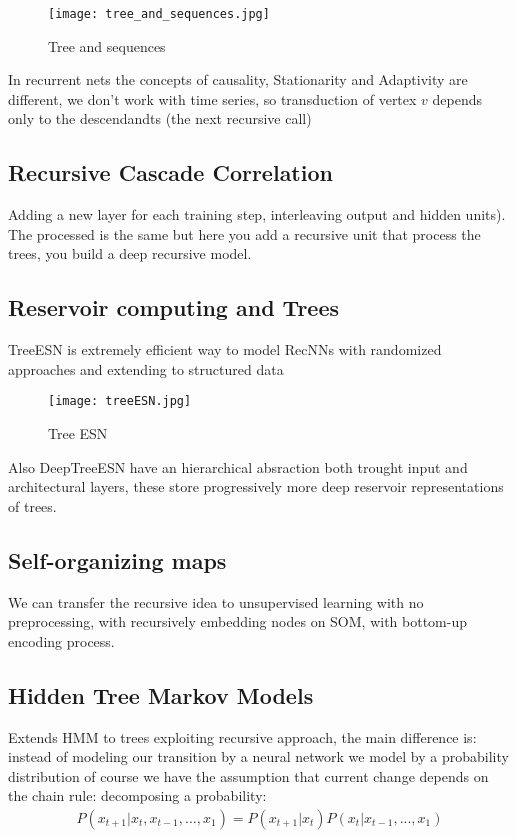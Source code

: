 \documentclass[12pt]{book}
\begin{document}
\begin{figure}[h!]
	\centering
	\texttt{[image: tree\_and\_sequences.jpg]}
	\caption{Tree and sequences}
	\label{fig:tree_rnn}
\end{figure}

In recurrent nets the concepts of causality, Stationarity and Adaptivity are different, we don't work with time series, so transduction of vertex $v$ depends only to the descendandts (the next recursive call)

\subsection{Recursive Cascade Correlation}
Adding a new layer for each training step, interleaving output and hidden units). The processed is the same but here you add a recursive unit that process the trees, you build a deep recursive model.

\subsection{Reservoir computing and Trees}
TreeESN is extremely efficient way to model RecNNs with randomized approaches and extending to structured data

\begin{figure}[h!]
	\centering
	\texttt{[image: treeESN.jpg]}
	\caption{Tree ESN}
	\label{fig:tree_esn}
\end{figure}

Also DeepTreeESN have an hierarchical absraction both trought input and architectural layers, these store progressively more deep reservoir representations of trees.

\subsection{Self-organizing maps}
We can transfer the recursive idea to unsupervised learning with no preprocessing, with recursively embedding nodes on SOM, with bottom-up encoding process.
\subsection{Hidden Tree Markov Models}
Extends HMM to trees exploiting recursive approach, the main difference is: instead of modeling our transition by a neural network we model by a probability distribution of course we have the assumption that current change depends on the chain rule: decomposing a probability:
\begin{equation}
	\begin{align}
	P(x_{t+1}|x_{t},x_{t-1},...,x_{1}) = P(x_{t+1}|x_{t})P(x_{t}|x_{t-1},...,x_{1}) \\
	\end{align}
\end{equation}
\end{document}
